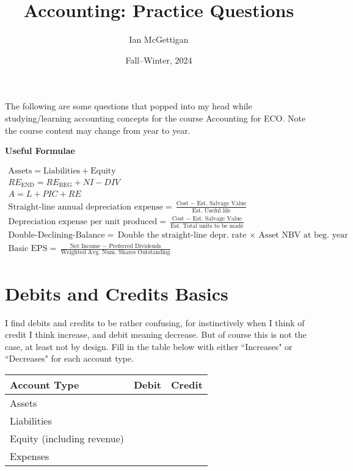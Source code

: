\documentclass{scrartcl}
\title{Accounting: Practice Questions}
\author{Ian McGettigan}
\date{Fall--Winter, 2024}
\begin{document}
\maketitle

\thispagestyle{empty}

\begin{center}
    The following are some questions that popped into my head while
    studying/learning accounting concepts for the course Accounting for
    ECO. Note the course content may change from year to year.
\end{center}

\bigskip

\textbf{Useful Formulae}

\begin{gather*}
    \text{Assets} = \text{Liabilities} + \text{Equity} \\
    RE_{\text{END} }=RE_{\text{BEG} }+NI-DIV \\
    A = L + PIC + RE \\
    \text{Straight-line annual depreciation expense} =
    \frac{\text{Cost~$-$~Est. Salvage Value} }{\text{Est. Useful life} } \\
    \text{Depreciation expense per unit produced} =
    \frac{\text{Cost~$-$~Est. Salvage Value} }{\text{Est. 
    Total units to be made} } \\
    \text{Double-Declining-Balance} = 
    \text{Double the straight-line depr. rate~$\times$~Asset NBV at 
    beg. year} \\
    \text{Basic EPS} = \frac{\text{Net Income~$-$~Preferred Dividends} }
    {\text{Weighted Avg. Num. Shares Outstanding} }
\end{gather*}


\section{Debits and Credits Basics}

I find debits and credits to be rather confusing, for instinctively when
I think of credit I think increase, and debit meaning decrease. But of
course this is not the case, at least not by design. Fill in the table
below with either ``Increases" or ``Decreases" for each account type.

\begin{center}
\begin{tabular}{|l|l|l|} \hline
    \textbf{Account Type} & \textbf{Debit} & \textbf{Credit} \\ \hline
    Assets & \phantom{Increases} & \phantom{Decreases} \\ \hline 
    Liabilities & & \\ \hline
    Equity (including revenue) & & \\ \hline
    Expenses & & \\ \hline
\end{tabular}
\end{center}
\newpage
\end{document}
